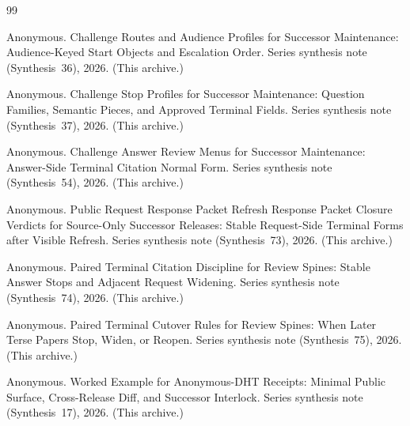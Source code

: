 \documentclass[11pt]{article}
\begin{document}
\begin{thebibliography}{99}\small

Anonymous.
\newblock Challenge Routes and Audience Profiles for Successor Maintenance: Audience-Keyed Start Objects and Escalation Order.
\newblock Series synthesis note (Synthesis~36), 2026. (This archive.)

Anonymous.
\newblock Challenge Stop Profiles for Successor Maintenance: Question Families, Semantic Pieces, and Approved Terminal Fields.
\newblock Series synthesis note (Synthesis~37), 2026. (This archive.)

Anonymous.
\newblock Challenge Answer Review Menus for Successor Maintenance: Answer-Side Terminal Citation Normal Form.
\newblock Series synthesis note (Synthesis~54), 2026. (This archive.)

Anonymous.
\newblock Public Request Response Packet Refresh Response Packet Closure Verdicts for Source-Only Successor Releases: Stable Request-Side Terminal Forms after Visible Refresh.
\newblock Series synthesis note (Synthesis~73), 2026. (This archive.)

Anonymous.
\newblock Paired Terminal Citation Discipline for Review Spines: Stable Answer Stops and Adjacent Request Widening.
\newblock Series synthesis note (Synthesis~74), 2026. (This archive.)

Anonymous.
\newblock Paired Terminal Cutover Rules for Review Spines: When Later Terse Papers Stop, Widen, or Reopen.
\newblock Series synthesis note (Synthesis~75), 2026. (This archive.)

Anonymous.
\newblock Worked Example for Anonymous-DHT Receipts: Minimal Public Surface, Cross-Release Diff, and Successor Interlock.
\newblock Series synthesis note (Synthesis~17), 2026. (This archive.)

\end{thebibliography}
\end{document}
